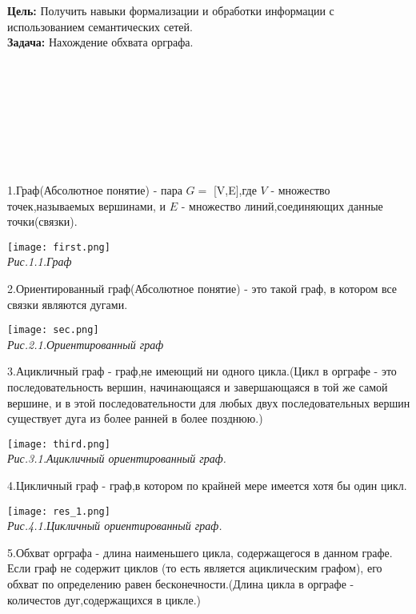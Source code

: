 \documentclass[a4paper,11pt]{article}
\author{Министерство образования Республики Беларусь \\ \\

Учреждение образования \\
“Белорусский государственный университет \\
информатики и радиоэлектроники” \\ \\ 

Факультет информационных технологий и управления \\ 
Кафедра интеллектуальных информационных технологий \\
 \\ \\ \\ \\ \\ \\ \\ \\ \\ \\ \\ \\ \\ \\ \\ \\ \\ \Large{\textbf{РАСЧЁТНАЯ РАБОТА}} \\ \Large{по дисциплине «Традиционные и интеллектуальные информационные \\ технологии» \\
на тему \\
\textbf{«Задача нахождения обхвата орграфа»}}
 \\ \\ \\ \\ \\ \\ \\ \\ \\ \\ \\ \\ \\ \\ \\}
\date{\begin{flushleft}
Выполнил (Самчук Е.А.) \\ студент группы \\ 021703 \\
Проверил (Юрков А.А.)
\end{flushleft}Минск 2021}
\begin{document}
\maketitle
\begin{flushleft}
\Large{\textbf{Цель:} Получить навыки формализации и обработки информации с \\ использованием семантических сетей.} \\
\Large{\textbf{Задача: } Нахождение обхвата орграфа.} \\ \\ \\  \\
\end{flushleft}
 \\ \\  \\ \\
\begin{flushleft}
\large{1.Граф(Абсолютное понятие) - пара $G =$ [V,E],где $V$ - множество точек,называемых вершинами, и $E$ - множество линий,соединяющих данные точки(связки).}
\end{flushleft}
\texttt{[image: first.png]} \\
\textit{Рис.1.1.Граф} \\
\begin{flushleft}
2.Ориентированный граф(Абсолютное понятие) -  это такой граф, в котором все связки являются дугами. \\
\end{flushleft}
\texttt{[image: sec.png]} \\ \textit{Рис.2.1.Ориентированный граф} \\ 
\begin{flushleft}
3.Ацикличный граф - граф,не имеющий ни одного цикла.(Цикл в орграфе - это последовательность вершин, начинающаяся и завершающаяся в той же самой вершине, и в этой последовательности для любых двух последовательных вершин существует дуга из более ранней в более позднюю.)
\end{flushleft}
\texttt{[image: third.png]} \\
\textit{Рис.3.1.Ацикличный ориентированный граф.}
\begin{flushleft}
\large{4.Цикличный граф - граф,в котором по крайней мере имеется хотя бы один цикл.}
\end{flushleft}
\texttt{[image: res\_1.png]} \\ \textit{Рис.4.1.Цикличный ориентированный граф.} \\
\begin{flushleft}

\large{5.Обхват орграфа - длина наименьшего цикла, содержащегося в данном графе. Если граф не содержит циклов (то есть является ациклическим графом), его обхват по определению равен бесконечности.(Длина цикла в орграфе - количестов дуг,содержащихся в цикле.) }\\ \\
\end{flushleft}
\end{document}
